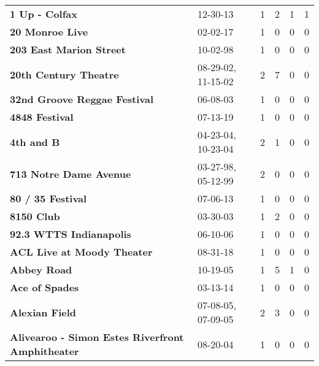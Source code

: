 \begin{supertabular}{p{0.4\textwidth}p{0.3\textwidth}p{0.05\textwidth}p{0.05\textwidth}p{0.05\textwidth}p{0.05\textwidth}}
                                               \textbf{1 Up - Colfax} &            12-30-13 &  1 &  2 &  1 &  1 \\
                                              \textbf{20 Monroe Live} &            02-02-17 &  1 &  0 &  0 &  0 \\
                                      \textbf{203 East Marion Street} &            10-02-98 &  1 &  0 &  0 &  0 \\
                                        \textbf{20th Century Theatre} &  08-29-02, 11-15-02 &  2 &  7 &  0 &  0 \\
                                 \textbf{32nd Groove Reggae Festival} &            06-08-03 &  1 &  0 &  0 &  0 \\
                                               \textbf{4848 Festival} &            07-13-19 &  1 &  0 &  0 &  0 \\
                                                   \textbf{4th and B} &  04-23-04, 10-23-04 &  2 &  1 &  0 &  0 \\
                                       \textbf{713 Notre Dame Avenue} &  03-27-98, 05-12-99 &  2 &  0 &  0 &  0 \\
                                            \textbf{80 / 35 Festival} &            07-06-13 &  1 &  0 &  0 &  0 \\
                                                   \textbf{8150 Club} &            03-30-03 &  1 &  2 &  0 &  0 \\
                                      \textbf{92.3 WTTS Indianapolis} &            06-10-06 &  1 &  0 &  0 &  0 \\
                                   \textbf{ACL Live at Moody Theater} &            08-31-18 &  1 &  0 &  0 &  0 \\
                                                  \textbf{Abbey Road} &            10-19-05 &  1 &  5 &  1 &  0 \\
                                               \textbf{Ace of Spades} &            03-13-14 &  1 &  0 &  0 &  0 \\
                                               \textbf{Alexian Field} &  07-08-05, 07-09-05 &  2 &  3 &  0 &  0 \\
             \textbf{Alivearoo - Simon Estes Riverfront Amphitheater} &            08-20-04 &  1 &  0 &  0 &  0 \\

\end{supertabular}
